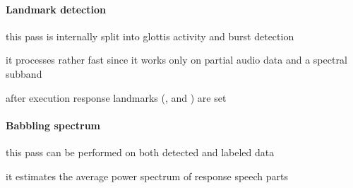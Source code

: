 \paragraph{Landmark detection}
\begin{itemize*}
	\item this pass is internally split into glottis activity and burst detection
	\item it processes rather fast since it works only on partial audio data and a spectral subband
	\item after execution response landmarks (,  and ) are set
\end{itemize*}

\paragraph{Babbling spectrum}
\begin{itemize*}
	\item this pass can be performed on both detected and labeled data
	\item it estimates the average power spectrum of response speech parts
\end{itemize*}


